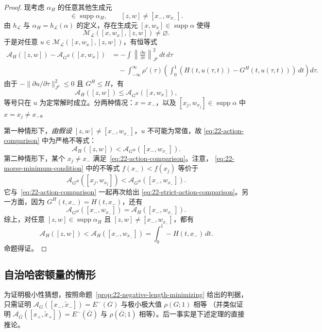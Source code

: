 \begin{proof}
现考虑 $\alpha_H$ 的任意其他生成元
\begin{equation}
 [z,w]\in\operatorname{supp}\alpha_H,
 \qquad [z,w]\neq[x_-,w_{x_-}].
 \label{eq:22-other-generator}
\end{equation}
由 $h_{\mathcal L}$ 与 $\alpha_H=h_{\mathcal L}(\alpha)$ 的定义，存在生成元
$[x,w_x]\in\operatorname{supp}\alpha$ 使得
\[
 \mathcal M_{\mathcal L}([x,w_x],[z,w])\neq\varnothing.
\]
于是对任意 $u\in\mathcal M_{\mathcal L}([x,w_x],[z,w])$，有恒等式
\[
 \begin{aligned}
 \mathcal A_H([z,w])-\mathcal A_{G^H}([x,w_x])
 &=-\int\left\lVert\frac{\partial u}{\partial\tau}\right\rVert_{J^\rho}^2
 \,dt\,d\tau\\
 &\quad-\int_{-\infty}^{\infty}\rho'(\tau)
 \left(\int_0^1(H(t,u(\tau,t))-G^H(t,u(\tau,t)))\,dt\right)d\tau.
 \end{aligned}
\]
由于 $-\lVert\partial u/\partial\tau\rVert_{J^\rho}^2\leq0$ 且 $G^H\leq H$，有
\begin{equation}
 \mathcal A_H([z,w])\leq\mathcal A_{G^H}([x,w_x]),
 \label{eq:22-action-comparison}
\end{equation}
等号只在 $u$ 为定常解时成立。分两种情况：$x=x_-$，以及
$[x_j,w_{x_j}]\in\operatorname{supp}\alpha$ 中 $x=x_j\neq x_-$。

第一种情形下，\emph{由假设} $[z,w]\neq[x_-,w_{x_-}]$，$u$ 不可能为常值，故
\eqref{eq:22-action-comparison} 中为严格不等式：
\begin{equation}
 \mathcal A_H([z,w])<\mathcal A_{G^H}([x_-,w_{x_-}]).
 \label{eq:22-strict-action-comparison}
\end{equation}
第二种情形下，某个 $x_j\neq x_-$ 满足~\eqref{eq:22-action-comparison}。注意，
\eqref{eq:22-morse-minimum-condition} 中的不等式 $f(x_-)<f(x_j)$ 等价于
\[
 \mathcal A_{G^H}([x_j,w_{x_j}])
 <\mathcal A_{G^H}([x_-,w_{x_-}]).
\]
它与~\eqref{eq:22-action-comparison} 一起再次给出
\eqref{eq:22-strict-action-comparison}。另一方面，因为
$G^H(t,x_-)=H(t,x_-)$，还有
\[
 \mathcal A_{G^H}([x_-,w_{x_-}])=\mathcal A_H([x_-,w_{x_-}]).
\]
综上，对任意
$[z,w]\in\operatorname{supp}\alpha_H$ 且 $[z,w]\neq[x_-,w_{x_-}]$，都有
\[
 \mathcal A_H([z,w])<\mathcal A_H([x_-,w_{x_-}])
 =\int_0^1-H(t,x_-)\,dt.
\]
命题得证。
\end{proof}

\subsection{自治哈密顿量的情形}

为证明极小性猜想，按照命题~\ref{prop:22-negative-length-minimizing} 给出的判据，只需证明
$\mathcal A_G([x_-,\widetilde x_-])=E^-(G)$ 与极小极大值 $\rho(G;1)$ 相等
（并类似证明 $\mathcal A_{\overline G}([x_+,\widetilde x_+])=E^-(\overline G)$
与 $\rho(\overline G;1)$ 相等）。后一事实是下述定理的直接推论。

